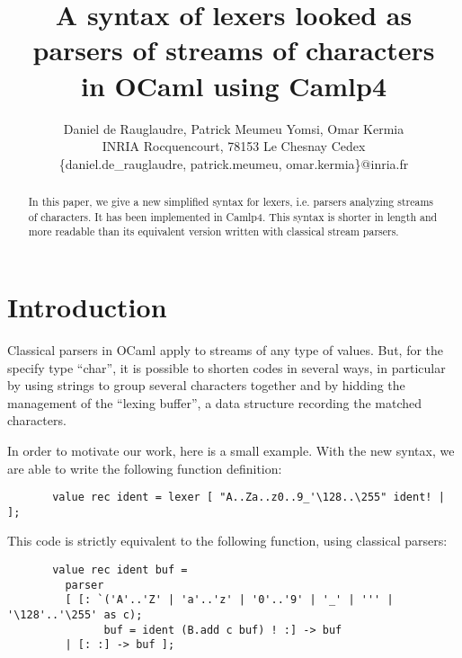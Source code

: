 \documentclass[11pt]{article}
\begin{document}
\title{A syntax of lexers looked as parsers of streams of characters\\
  in OCaml using Camlp4}

\date{}
\author{Daniel de Rauglaudre, Patrick Meumeu Yomsi, Omar Kermia\\
INRIA Rocquencourt,
78153 Le Chesnay Cedex \\
\{daniel.de\_rauglaudre, patrick.meumeu, omar.kermia\}@inria.fr}

\thispagestyle{empty}

\maketitle

\begin{abstract}
In this paper, we give a new simplified syntax for lexers,
i.e. parsers analyzing streams of characters. It has been implemented
in Camlp4. This syntax is shorter in length and more readable than its
equivalent version written with classical stream parsers.
\end{abstract}

\section{Introduction}

Classical parsers in OCaml apply to streams of any type of
values. But, for the specify type ``char'', it is possible to shorten
codes in several ways, in particular by using strings to group several
characters together and by hidding the management of the ``lexing
buffer'', a data structure recording the matched characters.

In order to motivate our work, here is a small example. With the new
syntax, we are able to write the following function definition:

\begin{verbatim}
       value rec ident = lexer [ "A..Za..z0..9_'\128..\255" ident! | ];
\end{verbatim}

This code is strictly equivalent to the following function, using classical
parsers:

\begin{verbatim}
       value rec ident buf =
         parser
         [ [: `('A'..'Z' | 'a'..'z' | '0'..'9' | '_' | ''' | '\128'..'\255' as c);
               buf = ident (B.add c buf) ! :] -> buf
         | [: :] -> buf ];
\end{verbatim}
\end{document}
